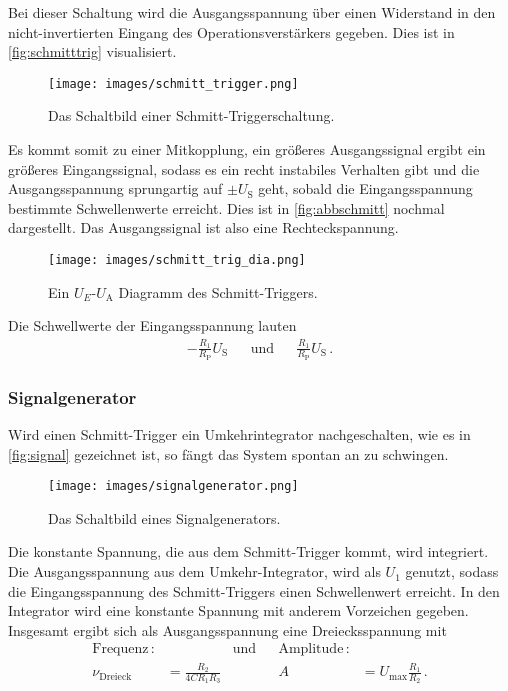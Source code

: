            \noindent 
            Bei dieser Schaltung wird die Ausgangsspannung über einen Widerstand in den nicht-invertierten Eingang des Operationsverstärkers gegeben.
            Dies ist in \autoref{fig:schmitttrig} visualisiert.
            \begin{figure}[H]
                \centering
                \texttt{[image: images/schmitt\_trigger.png]}
                \caption{Das Schaltbild einer Schmitt-Triggerschaltung. \cite{V51}}
                \label{fig:schmitttrig}
            \end{figure}
            Es kommt somit zu einer Mitkopplung, ein größeres Ausgangssignal ergibt ein größeres Eingangssignal, sodass es ein recht instabiles Verhalten gibt 
            und die Ausgangsspannung sprungartig auf $\pm U_\text{S}$ geht, sobald die Eingangsspannung bestimmte Schwellenwerte erreicht. 
            Dies ist in \autoref{fig:abbschmitt} nochmal dargestellt. Das Ausgangssignal ist also eine Rechteckspannung.
            \begin{figure}[H]
                \centering
                \texttt{[image: images/schmitt\_trig\_dia.png]}
                \caption{Ein $U_E$-$U_\text{A}$ Diagramm des Schmitt-Triggers. \cite{Joachim}}
                \label{fig:abbschmitt}
            \end{figure}
            Die Schwellwerte der Eingangsspannung lauten 
            \begin{align*}
                - \frac{R_1}{R_\text{P}} U_\text{S} && \text{und} && \frac{R_1}{R_\text{P}} U_\text{S} \, .
            \end{align*}

        \subsubsection{Signalgenerator}

            \noindent 
            Wird einen Schmitt-Trigger ein Umkehrintegrator nachgeschalten, wie es in \autoref{fig:signal} gezeichnet ist, so fängt das System spontan an zu 
            schwingen. 
            \begin{figure}[H]
                \centering
                \texttt{[image: images/signalgenerator.png]}
                \caption{Das Schaltbild eines Signalgenerators. \cite{V51}}
                \label{fig:signal}
            \end{figure}
            Die konstante Spannung, die aus dem Schmitt-Trigger kommt, wird integriert. 
            Die Ausgangsspannung aus dem Umkehr-Integrator, wird als $U_1$ genutzt, sodass die Eingangsspannung des Schmitt-Triggers einen
            Schwellenwert erreicht. 
            In den Integrator wird eine konstante Spannung mit anderem Vorzeichen gegeben. 
            Insgesamt ergibt sich als Ausgangsspannung eine Dreiecksspannung mit 
            \begin{align*}
                \text{Frequenz}\, : & & \text{und} & & \text{Amplitude}\, :& \\
                \nu_\text{Dreieck} &= \frac{R_2}{4 C R_1 R_3} & & &A &=  U_\text{max} \frac{R_1}{R_2} \, .
            \end{align*}
